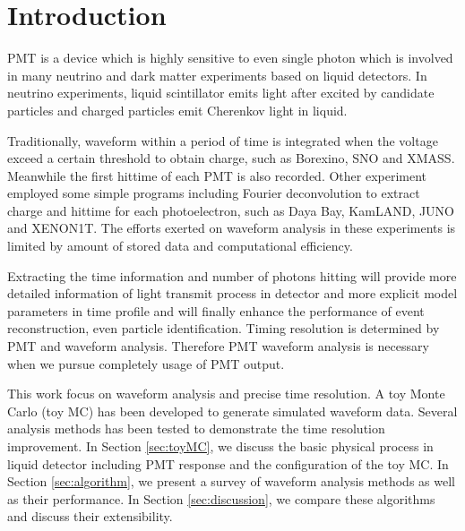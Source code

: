 \section{Introduction} %
\label{sec:introduction}

PMT is a device which is highly sensitive to even single photon which is involved in many neutrino and dark matter experiments based on liquid detectors. In neutrino experiments, liquid scintillator emits light after excited by candidate particles and charged particles emit Cherenkov light in liquid. 

Traditionally, waveform within a period of time is integrated when the voltage exceed a certain threshold to obtain charge, such as Borexino\cite{lagomarsino_gateless_1999}, SNO\cite{dunger_event_2019} and XMASS\cite{abe_xmass_2013}. Meanwhile the first hittime of each PMT is also recorded. Other experiment employed some simple programs including Fourier deconvolution to extract charge and hittime for each photoelectron, such as Daya Bay\cite{huang_flash_2018}, KamLAND\cite{the_kamland_collaboration_production_2010}, JUNO\cite{zhang_comparison_2019} and XENON1T\cite{aprile_xenon1t_2019}. The efforts exerted on waveform analysis in these experiments is limited by amount of stored data and computational efficiency. 

Extracting the time information and number of photons hitting will provide more detailed information of light transmit process in detector and more explicit model parameters in time profile and will finally enhance the performance of event reconstruction, even particle identification. Timing resolution is determined by PMT and waveform analysis. Therefore PMT waveform analysis is necessary when we pursue completely usage of PMT output. 

This work focus on waveform analysis and precise time resolution. A toy Monte Carlo (toy MC) has been developed to generate simulated waveform data. Several analysis methods has been tested to demonstrate the time resolution improvement. In Section \ref{sec:toyMC}, we discuss the basic physical process in liquid detector including PMT response and the configuration of the toy MC. In Section \ref{sec:algorithm}, we present a survey of waveform analysis methods as well as their performance. In Section \ref{sec:discussion}, we compare these algorithms and discuss their extensibility. 

